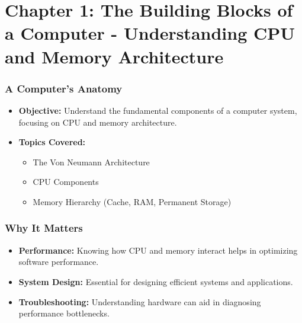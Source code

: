 \section{Chapter 1: The Building Blocks of a Computer - Understanding CPU and Memory Architecture}
\label{sec:chapter_1_coa}
\begin{frame} 
    \frametitle{A Computer's Anatomy}

    \begin{itemize}
        \item \textbf{Objective:} Understand the fundamental components of a computer system, focusing on CPU and memory architecture.
        \item \textbf{Topics Covered:}
        \begin{itemize}
            \item The Von Neumann Architecture
            \item CPU Components
            \item Memory Hierarchy (Cache, RAM, Permanent Storage)
        \end{itemize}
    \end{itemize}
\end{frame}

\begin{frame} 
    \frametitle{Why It Matters}

    \begin{itemize}
        \item \textbf{Performance:} Knowing how CPU and memory interact helps in optimizing software performance.
        \item \textbf{System Design:} Essential for designing efficient systems and applications.
        \item \textbf{Troubleshooting:} Understanding hardware can aid in diagnosing performance bottlenecks.
    \end{itemize}
\end{frame}

